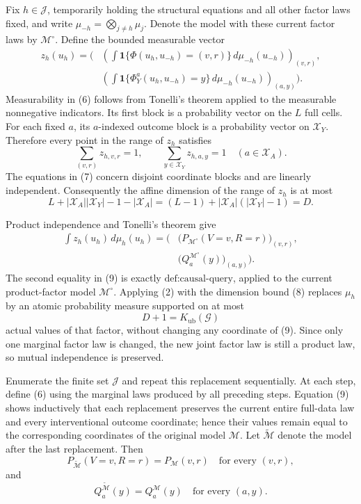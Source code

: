 Fix \(h\in\mathcal J\), temporarily holding the structural equations and all other factor laws fixed, and write \(\mu_{-h}=\bigotimes_{j\neq h}\mu_j\). Denote the model with these current factor laws by \(\mathcal M^{\circ}\). Define the bounded measurable vector
\[
\begin{aligned}
z_h(u_h)=\Bigg(&
\left(
\int \mathbf 1\{\Phi(u_h,u_{-h})=(v,r)\}\,d\mu_{-h}(u_{-h})
\right)_{(v,r)},\\
&\left(
\int \mathbf 1\{\Phi_Y^a(u_h,u_{-h})=y\}\,d\mu_{-h}(u_{-h})
\right)_{(a,y)}
\Bigg).
\end{aligned}
\tag{6}
\]
Measurability in (6) follows from Tonelli's theorem applied to the measurable nonnegative indicators. Its first block is a probability vector on the \(L\) full cells. For each fixed \(a\), its \(a\)-indexed outcome block is a probability vector on \(\mathcal X_Y\). Therefore every point in the range of \(z_h\) satisfies
\[
\sum_{(v,r)}z_{h,v,r}=1,
\qquad
\sum_{y\in\mathcal X_Y}z_{h,a,y}=1
\quad(a\in\mathcal X_A).
\tag{7}
\]
The equations in (7) concern disjoint coordinate blocks and are linearly independent. Consequently the affine dimension of the range of \(z_h\) is at most
\[
L+|\mathcal X_A||\mathcal X_Y|-1-|\mathcal X_A|
=(L-1)+|\mathcal X_A|(|\mathcal X_Y|-1)=D.
\tag{8}
\]

Product independence and Tonelli's theorem give
\[
\begin{aligned}
\int z_h(u_h)\,d\mu_h(u_h)
=\Big(&\bigl(P_{\mathcal M^{\circ}}(V=v,R=r)\bigr)_{(v,r)},\\
&\bigl(Q_a^{\mathcal M^{\circ}}(y)\bigr)_{(a,y)}\Big).
\end{aligned}
\tag{9}
\]
The second equality in (9) is exactly \(\text{def:causal-query}\), applied to the current product-factor model \(\mathcal M^{\circ}\). Applying (2) with the dimension bound (8) replaces \(\mu_h\) by an atomic probability measure supported on at most
\[
D+1=K_{\mathrm{ub}}(\mathcal G)
\tag{10}
\]
actual values of that factor, without changing any coordinate of (9). Since only one marginal factor law is changed, the new joint factor law is still a product law, so mutual independence is preserved.

Enumerate the finite set \(\mathcal J\) and repeat this replacement sequentially. At each step, define (6) using the marginal laws produced by all preceding steps. Equation (9) shows inductively that each replacement preserves the current entire full-data law and every interventional outcome coordinate; hence their values remain equal to the corresponding coordinates of the original model \(\mathcal M\). Let \(\widetilde{\mathcal M}\) denote the model after the last replacement. Then
\[
P_{\widetilde{\mathcal M}}(V=v,R=r)=P_{\mathcal M}(v,r)
\quad\text{for every }(v,r),
\tag{11}
\]
and
\[
Q_a^{\widetilde{\mathcal M}}(y)=Q_a^{\mathcal M}(y)
\quad\text{for every }(a,y).
\tag{12}
\]


